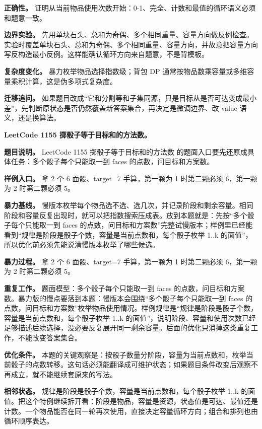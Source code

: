 \textbf{正确性。} 证明从当前物品使用次数开始：0-1、完全、计数和最值的循环语义必须和题意一致。

\textbf{边界实验。} 先用单块石头、总和为奇偶、多个相同重量、容量方向做反例检查。实验时覆盖单块石头、总和为奇偶、多个相同重量、容量方向，并故意把容量方向写反构造最小反例。这样能确认循环方向来自题意，不是背模板。

\textbf{复杂度变化。} 暴力枚举物品选择指数级；背包 DP 通常按物品数乘容量或多维容量乘积计算，这是伪多项式复杂度。

\textbf{迁移追问。} 如果题目改成“它和分割等和子集同源，只是目标从是否可达变成最小差”，先判断原状态是否仍然覆盖新答案集合，再决定是微调边界、改 value 语义，还是换算法。

\noindent\textbf{LeetCode 1155 掷骰子等于目标和的方法数。}

\textbf{题目说明。} LeetCode 1155 掷骰子等于目标和的方法数 的题面入口要先还原成具体任务：多个骰子每个只能取一到 faces 的点数，问目标和方案数。

\textbf{样例入口。} 拿 2 个 6 面骰、target=7 手算，第一颗为 1 时第二颗必须 6，第一颗为 2 时第二颗必须 5。

\textbf{暴力基线。} 慢版本枚举每个物品选不选、选几次，并记录阶段和剩余容量。相同阶段和容量反复出现时，就可以把指数搜索压成表。放到本题就是：先按“多个骰子每个只能取一到 faces 的点数，问目标和方案数”完整试慢版本；样例里已经能看到“规律是阶段是骰子个数，容量是当前点数和，每个骰子枚举 1..k 的面值”，所以优化前必须先能说清慢版本枚举了哪些候选。

\textbf{暴力过程。} 拿 2 个 6 面骰、target=7 手算，第一颗为 1 时第二颗必须 6，第一颗为 2 时第二颗必须 5。

\textbf{重复工作。} 题面模型：多个骰子每个只能取一到 faces 的点数，问目标和方案数。暴力版的慢点要落到本题：慢版本会围绕“多个骰子每个只能取一到 faces 的点数，问目标和方案数”枚举物品使用情况。样例规律是“规律是阶段是骰子个数，容量是当前点数和，每个骰子枚举 1..k 的面值”，说明阶段、容量和使用次数已经足够描述后续选择，没必要反复展开同一剩余容量。后面的优化只消掉这类重复工作，不能改变答案集合。

\textbf{优化条件。} 本题的关键观察是：按骰子数量分阶段，容量为当前点数和，枚举当前骰子的点数转移。这句话必须能翻译成可维护状态；如果题目条件改变后观察不再成立，就不能继续套原来的写法。

\textbf{相邻状态。} 规律是阶段是骰子个数，容量是当前点数和，每个骰子枚举 1..k 的面值。把这个特例继续拆开看：阶段是物品，容量是资源，状态值是可达、最值还是计数。一个物品能否在同一轮再次使用，直接决定容量循环方向；组合和排列也由循环顺序表达。

